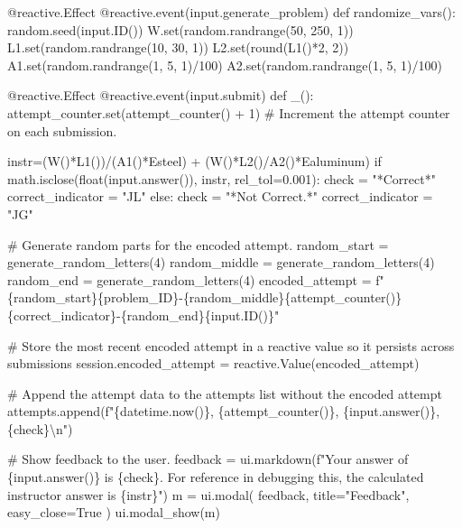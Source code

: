 \documentclass[
  letterpaper,
  DIV=11,
  numbers=noendperiod]{scrreprt}
\newenvironment{Shaded}{\begin{snugshade}}{\end{snugshade}}
\newcommand{\NormalTok}[1]{\textcolor[rgb]{0.00,0.23,0.31}{#1}}
\begin{document}
\begin{Shaded}
\begin{Highlighting}[]
\NormalTok{    @reactive.Effect}
\NormalTok{    @reactive.event(input.generate\_problem)}
\NormalTok{    def randomize\_vars():}
\NormalTok{        random.seed(input.ID())}
\NormalTok{        W.set(random.randrange(50, 250, 1))}
\NormalTok{        L1.set(random.randrange(10, 30, 1))}
\NormalTok{        L2.set(round(L1()*2, 2))}
\NormalTok{        A1.set(random.randrange(1, 5, 1)/100)}
\NormalTok{        A2.set(random.randrange(1, 5, 1)/100)}
        
        
\NormalTok{    @reactive.Effect}
\NormalTok{    @reactive.event(input.submit)}
\NormalTok{    def \_():}
\NormalTok{        attempt\_counter.set(attempt\_counter() + 1)  \# Increment the attempt counter on each submission.}
        
\NormalTok{        instr=(W()*L1())/(A1()*Esteel) + (W()*L2()/A2()*Ealuminum)}
\NormalTok{        if math.isclose(float(input.answer()), instr, rel\_tol=0.001):}
\NormalTok{            check = "*Correct*"}
\NormalTok{            correct\_indicator = "JL"}
\NormalTok{        else:}
\NormalTok{            check = "*Not Correct.*"}
\NormalTok{            correct\_indicator = "JG"}

\NormalTok{        \# Generate random parts for the encoded attempt.}
\NormalTok{        random\_start = generate\_random\_letters(4)}
\NormalTok{        random\_middle = generate\_random\_letters(4)}
\NormalTok{        random\_end = generate\_random\_letters(4)}
\NormalTok{        encoded\_attempt = f"\{random\_start\}\{problem\_ID\}{-}\{random\_middle\}\{attempt\_counter()\}\{correct\_indicator\}{-}\{random\_end\}\{input.ID()\}"}

\NormalTok{        \# Store the most recent encoded attempt in a reactive value so it persists across submissions}
\NormalTok{        session.encoded\_attempt = reactive.Value(encoded\_attempt)}

\NormalTok{        \# Append the attempt data to the attempts list without the encoded attempt}
\NormalTok{        attempts.append(f"\{datetime.now()\}, \{attempt\_counter()\}, \{input.answer()\}, \{check\}\textbackslash{}n")}

\NormalTok{        \# Show feedback to the user.}
\NormalTok{        feedback = ui.markdown(f"Your answer of \{input.answer()\} is \{check\}. For reference in debugging this, the calculated instructor answer is \{instr\}")}
\NormalTok{        m = ui.modal(}
\NormalTok{            feedback,}
\NormalTok{            title="Feedback",}
\NormalTok{            easy\_close=True}
\NormalTok{        )}
\NormalTok{        ui.modal\_show(m)}


\end{Highlighting}
\end{Shaded}
\end{document}
